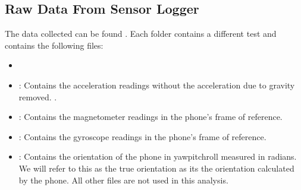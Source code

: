 \documentclass[letterpaper,10pt,english]{jupyterBook}
\begin{document}
\subsection{Raw Data From Sensor Logger}
\label{\detokenize{7RealData:raw-data-from-sensor-logger}}
\sphinxAtStartPar
The data collected can be found . Each folder contains a different test and contains the following files:
\begin{itemize}
\item {} 
\sphinxAtStartPar
{}

\item {} 
\sphinxAtStartPar
{}: Contains the acceleration readings without the acceleration due to gravity removed. .

\item {} 
\sphinxAtStartPar
{}: Contains the magnetometer readings in the phone’s frame of reference. 

\item {} 
\sphinxAtStartPar
{}: Contains the gyroscope readings in the phone’s frame of reference. 

\item {} 
\sphinxAtStartPar
{}: Contains the orientation of the phone in yaw\sphinxhyphen{}pitch\sphinxhyphen{}roll measured in radians. We will refer to this as the true orientation as its the orientation calculated by the phone.
All other files are not used in this analysis.

\end{itemize}
\end{document}
